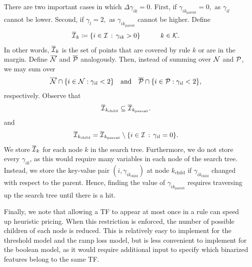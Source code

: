 There are two important cases in which $\Delta \gamma_{ik} = 0$.
First, if $\gamma_{ik_\text{parent}} = 0,$ as $\gamma_{il}$ cannot be lower.
Second, if $\gamma_l = 2,$ as $\gamma_{ik_\text{parent}}$ cannot be higher.
Define
\begin{equation}
    \overline \I_k \coloneqq \{i \in \I \fw \gamma_{ik} > 0\} \tquad k \in \K.\label{eq:ramp_I_k}
\end{equation}
In other words, $\overline \I_k$ is the set of points that are covered by rule $k$ or are in the margin.
Define $\overline \N$ and $\overline \P$ analogously.
Then, instead of summing over $\N$ and $\P$, we may sum over
\[
    \overline \N \cap \{i \in \N : \gamma_{il} < 2\} \quad \text{and} \quad \overline \P \cap \{i \in \P : \gamma_{il} < 2\},
\]
respectively.
Observe that
\[
    \overline \I_{k_\text{child}} \subseteq \overline \I_{k_\text{parent}}.
\]
and
\[
    \overline \I_{k_\text{child}} = \overline \I_{k_\text{parent}} \setminus \{i \in \I \fw \gamma_{il} = 0\}.
\]
We store $\overline \I_k$ for each node $k$ in the search tree.
Furthermore, we do not store every $\gamma_{ik}$, as this would require many variables in each node of the search tree.
Instead, we store the key-value pair $(i, \gamma_{ik_\text{child}})$ at node $k_\text{child}$ if $\gamma_{ik_\text{child}}$ changed with respect to the parent.
Hence, finding the value of $\gamma_{ik_\text{parent}}$ requires traversing up the search tree until there is a hit.

Finally, we note that allowing a TF to appear at most once in a rule can speed up heuristic pricing.
When this restriction is enforced, the number of possible children of each node is reduced.
This is relatively easy to implement for the threshold model and the ramp loss model,
but is less convenient to implement for the boolean model, as it would require additional input to specify which binarized features
belong to the same TF\@.